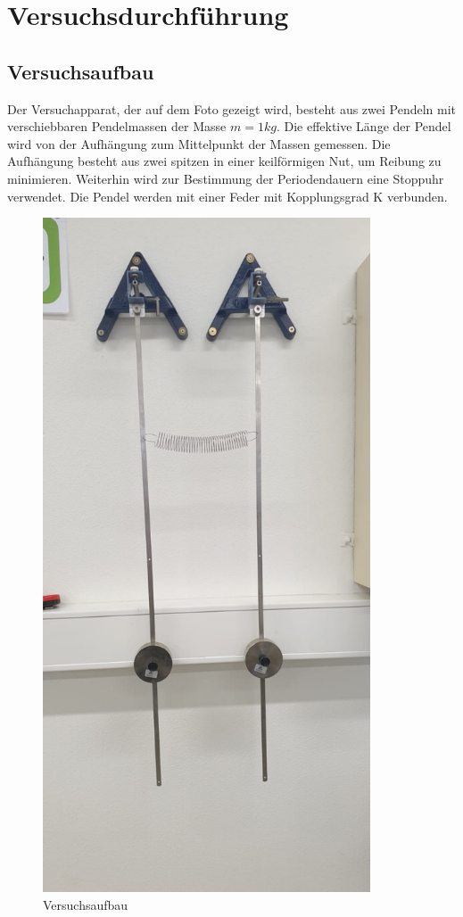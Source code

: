 

\section{Versuchsdurchführung}
\label{sec:Durchführung}
\subsection{Versuchsaufbau}
Der Versuchapparat, der auf dem Foto gezeigt wird, besteht aus zwei Pendeln mit verschiebbaren 
Pendelmassen der Masse $m=1kg$. Die effektive Länge der Pendel wird von der Aufhängung zum 
Mittelpunkt der Massen gemessen. Die Aufhängung besteht aus zwei spitzen in einer keilförmigen 
Nut, um Reibung zu minimieren. Weiterhin wird zur Bestimmung der Periodendauern eine Stoppuhr 
verwendet. Die Pendel werden mit einer Feder mit Kopplungsgrad K verbunden.
\begin{figure}
    \centering
    \includegraphics[width=9.71cm,height=20cm]{Bild.pdf}
    \caption{Versuchsaufbau}
    \label{fig:Versuchsaufbau}
  \end{figure}
